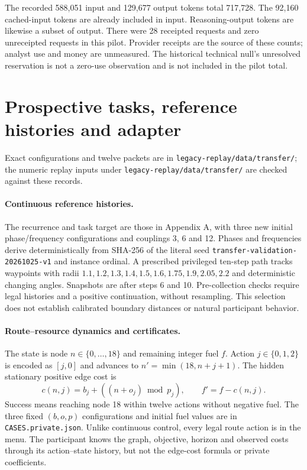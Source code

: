 The recorded 588,051 input and 129,677 output tokens total 717,728. The 92,160 cached-input tokens are already included in input. Reasoning-output tokens are likewise a subset of output. There were 28 receipted requests and zero unreceipted requests in this pilot. Provider receipts are the source of these counts; analyst use and money are unmeasured. The historical technical null's unresolved reservation is not a zero-use observation and is not included in the pilot total.

\section{Prospective tasks, reference histories and adapter}
\label{app:transfer}
Exact configurations and twelve packets are in
\texttt{legacy-replay/data/transfer/}; the numeric replay inputs under
\texttt{legacy-replay/data/transfer/} are checked against these records.

\paragraph{Continuous reference histories.}
The recurrence and task target are those in Appendix A, with three new
initial phase/frequency configurations and couplings 3, 6 and 12.
Phases and frequencies derive deterministically from SHA-256 of the
literal seed \texttt{transfer-validation-20261025-v1} and instance
ordinal. A prescribed privileged ten-step path tracks waypoints with
radii $1.1,1.2,1.3,1.4,1.5,1.6,1.75,1.9,2.05,2.2$ and deterministic
changing angles. Snapshots are after steps 6 and 10. Pre-collection
checks require legal histories and a positive continuation, without
resampling. This selection does not establish calibrated boundary
distances or natural participant behavior.

\paragraph{Route--resource dynamics and certificates.}
The state is node $n\in\{0,\ldots,18\}$ and remaining integer fuel $f$.
Action $j\in\{0,1,2\}$ is encoded as $[j,0]$ and advances to
$n'=\min(18,n+j+1)$. The hidden stationary positive edge cost is
\begin{equation}
c(n,j)=b_j+((n+o_j)\bmod p_j),\qquad f'=f-c(n,j).
\end{equation}
Success means reaching node 18 within twelve actions without negative
fuel. The three fixed $(b,o,p)$ configurations and initial fuel values
are in \texttt{CASES.private.json}. Unlike continuous control, every
legal route action is in the menu. The participant knows the graph,
objective, horizon and observed costs through its action--state history,
but not the edge-cost formula or private coefficients.

